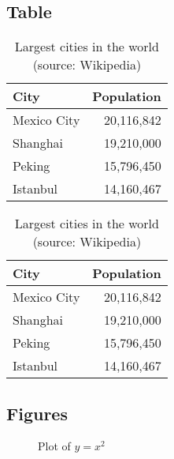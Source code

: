 \documentclass[
11pt,notheorems,hyperref={pdfauthor=Maghfira Ramadhani}
]{beamer}
\begin{document}
\subsection{Table}
\begin{frame}
    \begin{table}
        \caption{Largest cities in the world (source: Wikipedia)}
        \begin{tabular}{@{} lr @{}}
          \toprule
          City & Population\\
          \midrule
          Mexico City & 20,116,842\\
          Shanghai & 19,210,000\\
          Peking & 15,796,450\\
          Istanbul & 14,160,467\\
          \bottomrule
        \end{tabular}
        \hspace*{1cm}
            \setlength\extrarowheight{3pt}
        \begin{tabular}{|lr|}
          \hline
          \rowcolor{primary}\color{white}City & \color{white}Population\\
          \hline
          Mexico City & 20,116,842\\
          Shanghai & 19,210,000\\
          Peking & 15,796,450\\
          Istanbul & 14,160,467\\
          \hline
        \end{tabular}
    \end{table}
\end{frame}

\subsection{Figures}
\begin{frame}
    \begin{figure}[htbp]
        \centering
        \caption{Plot of $y=x^2$}
    \end{figure}

\end{frame}
\end{document}

